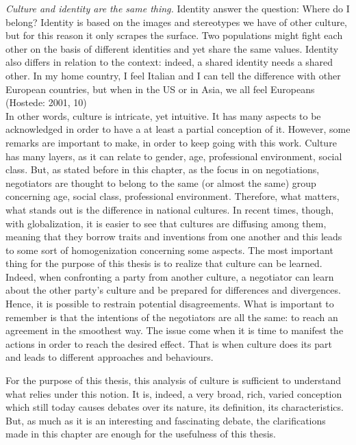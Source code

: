 \documentclass[../main.tex]{subfiles}
\begin{document}
\textit{Culture and identity are the same thing.} Identity answer the question: Where do I belong? Identity is based on the images and stereotypes we have of other culture, but for this reason it only scrapes the surface. Two populations might fight each other on the basis of different identities and yet share the same values. Identity also differs in relation to the context: indeed, a shared identity needs a shared other. In my home country, I feel Italian and I can tell the difference with other European countries, but when in the US or in Asia, we all feel Europeans (Hostede: 2001, 10)\\

In other words, culture is intricate, yet intuitive. It has many aspects to be acknowledged in order to have a at least a partial conception of it. However, some remarks are important to make, in order to keep going with this work. Culture has many layers, as it can relate to gender, age, professional environment, social class. But, as stated before in this chapter, as the focus in on negotiations, negotiators are thought to belong to the same (or almost the same) group concerning age, social class, professional environment. Therefore, what matters, what stands out is the difference in national cultures. In recent times, though, with globalization, it is easier to see that cultures are diffusing among them, meaning that they borrow traits and inventions from one another and this leads to some sort of homogenization concerning some aspects.
The most important thing for the purpose of this thesis is to realize that culture can be learned. Indeed, when confronting a party from another culture, a negotiator can learn about the other party's culture and be prepared for differences and divergences. Hence, it is possible to restrain potential disagreements. What is important to remember is that the intentions of the negotiators are all the same: to reach an agreement in the smoothest way. The issue come when it is time to manifest the actions in order to reach the desired effect. That is when culture does its part and leads to different approaches and behaviours.

For the purpose of this thesis, this analysis of culture is sufficient to understand what relies under this notion. It is, indeed, a very broad, rich, varied conception which still today causes debates over its nature, its definition, its characteristics. But, as much as it is an interesting and fascinating debate, the clarifications made in this chapter are enough for the usefulness of this thesis.
\end{document}
